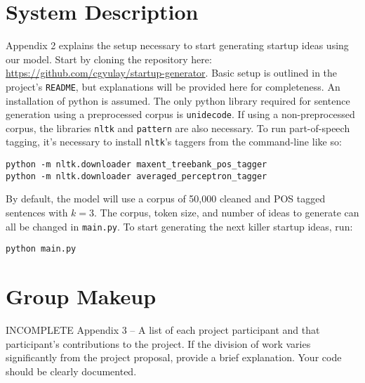 \documentclass[11pt]{article}
\begin{document}
\section{System Description}

Appendix 2 explains the setup necessary to start generating startup ideas using our model. Start by cloning the repository here: \url{https://github.com/cgyulay/startup-generator}. Basic setup is outlined in the project's \texttt{README}, but explanations will be provided here for completeness. An installation of python is assumed. The only python library required for sentence generation using a preprocessed corpus is \texttt{unidecode}. If using a non-preprocessed corpus, the libraries \texttt{nltk} and \texttt{pattern} are also necessary. To run part-of-speech tagging, it's necessary to install \texttt{nltk}'s taggers from the command-line like so:
\begin{lstlisting}
python -m nltk.downloader maxent_treebank_pos_tagger
python -m nltk.downloader averaged_perceptron_tagger
\end{lstlisting}
By default, the model will use a corpus of 50,000 cleaned and POS tagged sentences with \(k=3\). The corpus, token size, and number of ideas to generate can all be changed in \texttt{main.py}. To start generating the next killer startup ideas, run:
\begin{lstlisting}
python main.py
\end{lstlisting}

\section{Group Makeup}
INCOMPLETE
 Appendix 3 – A list of each project participant and that
participant’s contributions to the project. If the division of work
varies significantly from the project proposal, provide a brief
explanation.  Your code should be clearly documented. 



 

\end{document}
